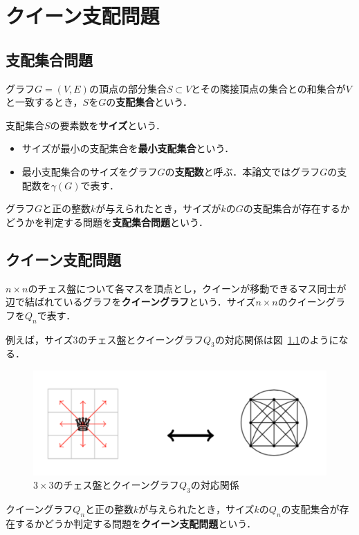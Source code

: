 \chapter{クイーン支配問題}\label{chap:background}

\section{支配集合問題}
グラフ$G=(V,E)$の頂点の部分集合$S\subset V$とその隣接頂点の集合との和集合が$V$と一致するとき，$S$を$G$の\textbf{支配集合}という．\par
支配集合$S$の要素数を\textbf{サイズ}という．
 \begin{itemize}
  \item サイズが最小の支配集合を\textbf{最小支配集合}という．
  \item 最小支配集合のサイズをグラフ$G$の\textbf{支配数}と呼ぶ．本論文ではグラフ$G$の支配数を$\gamma(G)$で表す．
 \end{itemize}
  グラフ$G$と正の整数$k$が与えられたとき，サイズが$k$の$G$の支配集合が存在するかどうかを判定する問題を\textbf{支配集合問題}という．
\section{クイーン支配問題}
$n\times n$のチェス盤について各マスを頂点とし，クイーンが移動できるマス同士が辺で結ばれているグラフを\textbf{クイーングラフ}という．サイズ$n\times n$のクイーングラフを$Q_n$で表す．\par
例えば，サイズ3のチェス盤とクイーングラフ$Q_3$の対応関係は図~\ref{ex:queengraph_3}のようになる．
 \begin{figure}[tb]
   \centering
   \includegraphics[width=1.0\linewidth]{fig/fig-queen_3_graph.pdf}
   \caption{$3 \times 3$のチェス盤とクイーングラフ$Q_3$の対応関係}
   \label{ex:queengraph_3}
 \end{figure}
クイーングラフ$Q_n$と正の整数$k$が与えられたとき，サイズ$k$の$Q_n$の支配集合が存在するかどうか判定する問題を\textbf{クイーン支配問題}という．\par

